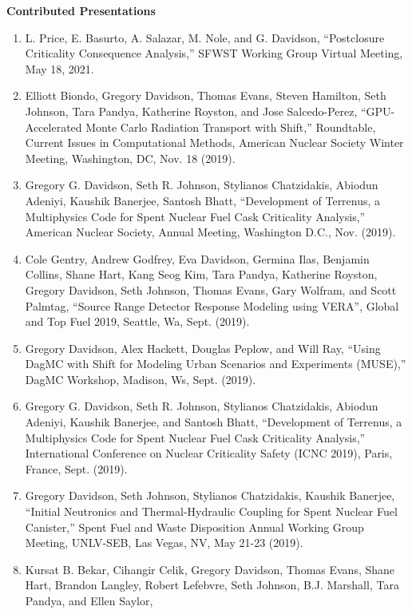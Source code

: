 \documentclass[letterpaper,11pt]{article}
\newcommand{\leftsubheading}[1]{
  \textbf{#1\vspace{-6pt} \\}}
\begin{document}
\leftsubheading{Contributed Presentations}
\begin{enumerate}
  \item L. Price, E. Basurto, A. Salazar, M. Nole, and G. Davidson,
    ``Postclosure Criticality Consequence Analysis,'' SFWST Working
    Group Virtual Meeting, May 18, 2021.
  \item Elliott Biondo, Gregory Davidson, Thomas Evans, Steven
    Hamilton, Seth Johnson, Tara Pandya, Katherine Royston, and Jose
    Salcedo-Perez, ``GPU-Accelerated Monte Carlo Radiation Transport
    with Shift,'' Roundtable, Current Issues in Computational Methods,
    American Nuclear Society Winter Meeting, Washington, DC, Nov. 18
    (2019).
  \item Gregory G. Davidson, Seth R. Johnson, Stylianos Chatzidakis,
    Abiodun Adeniyi, Kaushik Banerjee, Santosh Bhatt, ``Development
    of Terrenus, a Multiphysics Code for Spent Nuclear Fuel Cask
    Criticality Analysis,'' American Nuclear Society, Annual
    Meeting, Washington D.C., Nov. (2019).
  \item Cole Gentry, Andrew Godfrey, Eva Davidson, Germina Ilas,
    Benjamin Collins, Shane Hart, Kang Seog Kim, Tara Pandya,
    Katherine Royston, Gregory Davidson, Seth Johnson, Thomas Evans,
    Gary Wolfram, and Scott Palmtag, ``Source Range Detector
    Response Modeling using VERA'', Global and Top Fuel 2019,
    Seattle, Wa, Sept. (2019).
  \item Gregory Davidson, Alex Hackett, Douglas Peplow, and Will
    Ray, ``Using DagMC with Shift for Modeling Urban Scenarios and
    Experiments (MUSE),'' DagMC Workshop, Madison, Ws, Sept. (2019).
  \item Gregory G. Davidson, Seth R. Johnson, Stylianos Chatzidakis,
    Abiodun Adeniyi, Kaushik Banerjee, and Santosh Bhatt,
    ``Development of Terrenus, a Multiphysics Code for Spent Nuclear
    Fuel Cask Criticality Analysis,'' International Conference on
    Nuclear Criticality Safety (ICNC 2019), Paris, France,
    Sept. (2019).
  \item Gregory Davidson, Seth Johnson, Stylianos Chatzidakis, Kaushik
    Banerjee, ``Initial Neutronics and Thermal-Hydraulic Coupling for
    Spent Nuclear Fuel Canister,'' Spent Fuel and Waste Disposition
    Annual Working Group Meeting, UNLV-SEB, Las Vegas, NV, May 21-23
    (2019). 
  \item Kursat B. Bekar, Cihangir Celik, Gregory Davidson, Thomas
    Evans, Shane Hart, Brandon Langley, Robert Lefebvre, Seth
    Johnson, B.J. Marshall, Tara Pandya, and Ellen Saylor,

\end{enumerate}
\end{document}

